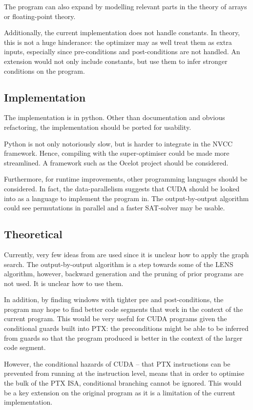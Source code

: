 \documentclass[letterpaper,twocolumn,10pt]{article}
\begin{document}
The program can also expand by modelling relevant parts in the theory of arrays
or floating-point theory.

Additionally, the current implementation does not handle constants. In theory,
this is not a huge hinderance: the optimizer may as well treat them as extra
inputs, especially since pre-conditions and post-conditions are not handled.
An extension would not only include constants, but use them to infer stronger
conditions on the program.

\subsection{Implementation}

The implementation is in python. Other than documentation and obvious
refactoring, the implementation should be ported for usability.

Python is not only notoriously slow, but is harder to integrate in the
NVCC framework. Hence, compiling with the super-optimiser could be made more
streamlined. A framework such as \cite{GPUOcelot} the Ocelot project
should be considered.

Furthermore, for runtime improvements, other programming languages should be
considered. In fact, the data-parallelism suggests that CUDA should be looked into
as a language to implement the program in. The output-by-output algorithm
could see permutations in parallel and a faster SAT-solver may be usable.

\subsection{Theoretical}

Currently, very few ideas from \cite{superopt} are used since it is
unclear how to apply the graph search. The output-by-output algorithm is
a step towards some of the LENS algorithm, however, backward generation
and the pruning of prior programs are not used. It is unclear how to use
them.

In addition, by finding windows with tighter pre and post-conditions,
the program may hope to find better code segments
that work in the context of the current program.
This would be very useful for CUDA programs given
the conditional guards built into PTX: the preconditions
might be able to be inferred from guards so that
the program produced is better in the context
of the larger code segment.

However, the conditional hazards of CUDA -- that
PTX instructions can be prevented from running
at the instruction level, means that in order to
optimise the bulk of the PTX ISA, conditional
branching cannot be ignored. This would be
a key extension on the original program as
it is a limitation of the current implementation.
\end{document}
